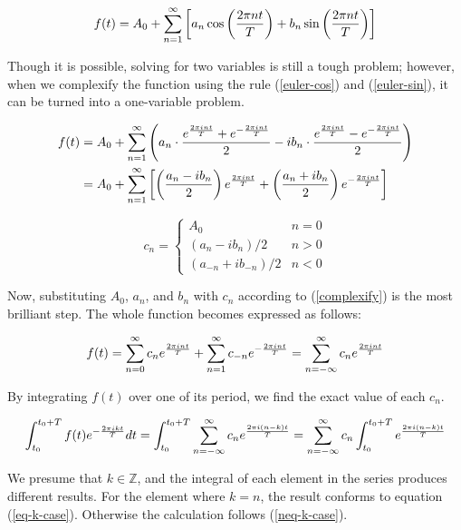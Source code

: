 \begin{equation}
	f(t)=A_0+\sum_{n=1}^\infty\left[a_n\cos\left(2\pi nt\over T\right)
	+b_n\sin\left(2\pi nt\over T\right)\right]
	\label{fourier-real}
\end{equation}

Though it is possible, solving for two variables is still a tough problem;
however, when we complexify the function using the rule (\ref{euler-cos}) and
(\ref{euler-sin}), it can be turned into a one-variable problem.

$$
\begin{aligned}
	f(t)
	&=A_0+\sum_{n=1}^\infty\left(
	a_n\cdot{e^{2\pi int\over T}+e^{-{2\pi int\over T}}\over2}
	-ib_n\cdot{e^{2\pi int\over T}-e^{-{2\pi int\over T}}\over 2}\right) \\
	&=A_0+\sum_{n=1}^\infty\left[
	\left(a_n-ib_n\over 2\right)e^{2\pi int\over T}
	+\left(a_n+ib_n\over 2\right)e^{-{2\pi int\over T}}
	\right]
\end{aligned}
$$

\begin{equation}
	c_n=
	\begin{cases}
		A_0 & n=0 \\
		(a_n-ib_n)/2 & n>0 \\
		(a_{-n}+ib_{-n})/2 & n<0
	\end{cases}
	\label{complexify}
\end{equation}

Now, substituting $A_0$, $a_n$, and $b_n$ with $c_n$ according to
(\ref{complexify}) is the most brilliant step. The whole function becomes
expressed as follows:

\begin{equation}
	f(t)=\sum_{n=0}^\infty c_ne^{2\pi int\over T}
	+\sum_{n=1}^\infty c_{-n}e^{-{2\pi int\over T}}
	=\sum_{n=-\infty}^\infty c_ne^{2\pi int\over T}
	\label{fourier-complex}
\end{equation}

By integrating $f(t)$ over one of its period, we find the exact value of each
$c_n$.

$$
\int_{t_0}^{t_0+T}f(t)e^{-{2\pi ikt\over T}}dt
=\int_{t_0}^{t_0+T}\sum_{n=-\infty}^\infty c_ne^{2\pi i(n-k)t\over T}
=\sum_{n=-\infty}^\infty c_n\int_{t_0}^{t_0+T}e^{2\pi i(n-k)t\over T}
$$

We presume that $k\in\mathbb{Z}$, and the integral of each element in the
series produces different results. For the element where $k=n$, the result
conforms to equation (\ref{eq-k-case}). Otherwise the calculation follows
(\ref{neq-k-case}).

